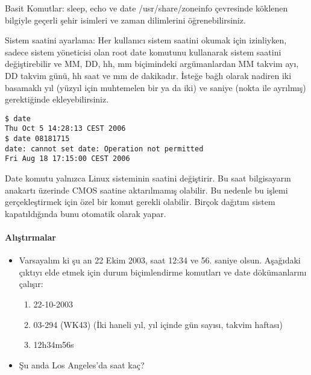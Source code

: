 \begin{section}{Basit Komutlar: sleep, echo ve date}
/usr/share/zoneinfo çevresinde köklenen bilgiyle geçerli şehir isimleri ve zaman dilimlerini öğrenebilirsiniz.

Sistem saatini ayarlama: Her kullanıcı sistem saatini okumak için izinliyken, sadece sistem yöneticisi olan root date komutunu kullanarak sistem saatini değiştirebilir ve MM, DD, hh, mm biçimindeki argümanlardan MM takvim ayı, DD takvim günü, hh saat ve mm de dakikadır. İsteğe bağlı olarak nadiren iki basamaklı yıl (yüzyıl için muhtemelen bir ya da iki) ve saniye (nokta ile ayrılmış) gerektiğinde ekleyebilirsiniz.
\begin{verbatim}
$ date
Thu Oct 5 14:28:13 CEST 2006
$ date 08181715
date: cannot set date: Operation not permitted
Fri Aug 18 17:15:00 CEST 2006
\end{verbatim}

Date komutu yalnızca Linux sisteminin saatini değiştirir. Bu saat bilgisayarın anakartı üzerinde CMOS saatine aktarılmamış olabilir. Bu nedenle bu işlemi gerçekleştirmek için özel bir komut gerekli olabilir. Birçok dağıtım sistem kapatıldığında bunu otomatik olarak yapar.

\paragraph{Alıştırmalar}{
\begin{itemize}
\item Varsayalım ki şu an 22 Ekim 2003, saat 12:34 ve 56. saniye olsun. Aşağıdaki çıktıyı elde etmek için durum biçimlendirme komutları ve date dökümanlarını
çalışır:
\begin{enumerate}
\item 22-10-2003
\item 03-294 (WK43)  (İki haneli yıl, yıl içinde gün sayısı, takvim haftası)
\item 12h34m56s
\end{enumerate}
\item Şu anda Los Angeles’da saat kaç?
\end{itemize}}
\end{section}

